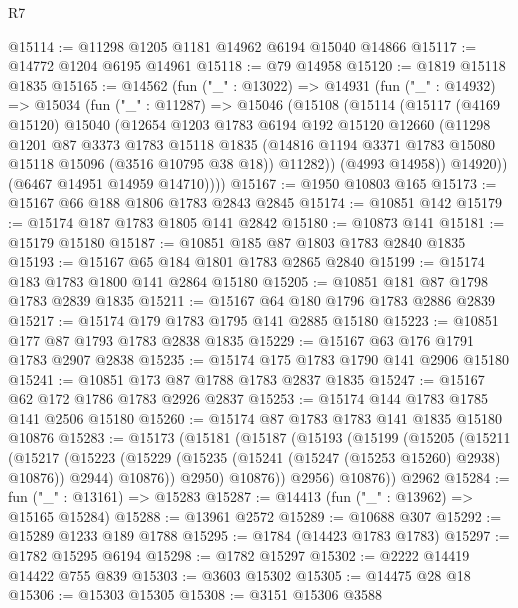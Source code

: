 \begin{lexlean}{R7}
\begin{coremodule}
@15114 := @11298 @1205 @1181 @14962 @6194 @15040 @14866
@15117 := @14772 @1204 @6195 @14961
@15118 := @79 @14958
@15120 := @1819 @15118 @1835
@15165 := @14562
    (fun ("_" : @13022) =>
    @14931
      (fun ("_" : @14932) =>
      @15034
        (fun ("_" : @11287) =>
        @15046
          (@15108
            (@15114
              (@15117
                (@4169 @15120)
                @15040
                (@12654
                  @1203
                  @1783
                  @6194
                  @192
                  @15120
                  @12660
                  (@11298
                    @1201
                    @87
                    @3373
                    @1783
                    @15118
                    @1835
                    (@14816 @1194 @3371 @1783 @15080 @15118 @15096 (@3516 @10795 @38 @18))
                    @11282))
                (@4993 @14958))
              @14920))
          (@6467 @14951 @14959 @14710))))
@15167 := @1950 @10803 @165
@15173 := @15167 @66 @188 @1806 @1783 @2843 @2845
@15174 := @10851 @142
@15179 := @15174 @187 @1783 @1805 @141 @2842
@15180 := @10873 @141
@15181 := @15179 @15180
@15187 := @10851 @185 @87 @1803 @1783 @2840 @1835
@15193 := @15167 @65 @184 @1801 @1783 @2865 @2840
@15199 := @15174 @183 @1783 @1800 @141 @2864 @15180
@15205 := @10851 @181 @87 @1798 @1783 @2839 @1835
@15211 := @15167 @64 @180 @1796 @1783 @2886 @2839
@15217 := @15174 @179 @1783 @1795 @141 @2885 @15180
@15223 := @10851 @177 @87 @1793 @1783 @2838 @1835
@15229 := @15167 @63 @176 @1791 @1783 @2907 @2838
@15235 := @15174 @175 @1783 @1790 @141 @2906 @15180
@15241 := @10851 @173 @87 @1788 @1783 @2837 @1835
@15247 := @15167 @62 @172 @1786 @1783 @2926 @2837
@15253 := @15174 @144 @1783 @1785 @141 @2506 @15180
@15260 := @15174 @87 @1783 @1783 @141 @1835 @15180 @10876
@15283 := @15173
    (@15181
      (@15187
        (@15193
          (@15199
            (@15205
              (@15211
                (@15217
                  (@15223
                    (@15229 (@15235 (@15241 (@15247 (@15253 @15260) @2938) @10876)) @2944)
                    @10876))
                @2950)
              @10876))
          @2956)
        @10876))
    @2962
@15284 := fun ("_" : @13161) => @15283
@15287 := @14413 (fun ("_" : @13962) => @15165 @15284)
@15288 := @13961 @2572
@15289 := @10688 @307
@15292 := @15289 @1233 @189 @1788
@15295 := @1784 (@14423 @1783 @1783)
@15297 := @1782 @15295 @6194
@15298 := @1782 @15297
@15302 := @2222 @14419 @14422 @755 @839
@15303 := @3603 @15302
@15305 := @14475 @28 @18
@15306 := @15303 @15305
@15308 := @3151 @15306 @3588

\end{coremodule}
\end{lexlean}
